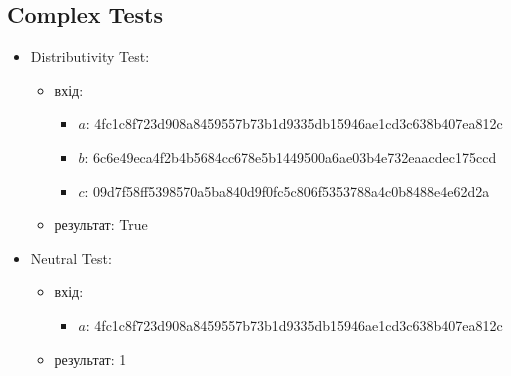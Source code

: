 \documentclass{article}
\begin{document}
\subsection{Complex Tests}
\begin{itemize}
    \item Distributivity Test:
        \begin{itemize}
            \item вхід: 
                \begin{itemize}
                    \item $a$: 4fc1c8f723d908a8459557b73b1d9335db15946ae1cd3c638b407ea812c
                    \item $b$: 6c6e49eca4f2b4b5684cc678e5b1449500a6ae03b4e732eaacdec175ccd
                    \item $c$: 09d7f58ff5398570a5ba840d9f0fc5c806f5353788a4c0b8488e4e62d2a
                \end{itemize}
            \item результат: True
        \end{itemize}
    \item Neutral Test:
        \begin{itemize}
            \item вхід: 
                \begin{itemize}
                    \item $a$: 4fc1c8f723d908a8459557b73b1d9335db15946ae1cd3c638b407ea812c
                \end{itemize}
            \item результат: 1
        \end{itemize}
\end{itemize}


\end{document}
